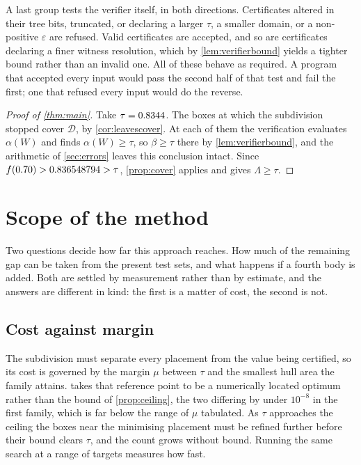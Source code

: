 \documentclass[a4paper,UKenglish,cleveref,autoref,thm-restate,numberwithinsect]{lipics-v2021}
\begin{document}
A last group tests the verifier itself, in both directions. Certificates altered
in their tree bits, truncated, or declaring a larger $\tau$, a smaller domain, or
a non-positive $\varepsilon$ are refused. Valid certificates are accepted, and so
are certificates declaring a finer witness resolution, which by
\cref{lem:verifierbound} yields a tighter bound rather than an invalid one. All
\ControlsPassed{} of these behave as required. A program that accepted every input
would pass the second half of that test and fail the first; one that refused every
input would do the reverse.

\begin{proof}[Proof of \cref{thm:main}]
Take $\tau=0.8344$. The boxes at which the subdivision stopped cover
$\mathcal{D}$, by \cref{cor:leavescover}. At each of them the verification
evaluates $\alpha(W)$ and finds $\alpha(W)\ge\tau$, so $\beta\ge\tau$ there by
\cref{lem:verifierbound}, and the arithmetic of \cref{sec:errors} leaves this
conclusion intact. Since $f(0.70)>0.836548794>\tau$, \cref{prop:cover} applies
and gives $\Lambda\ge\tau$.
\end{proof}

\section{Scope of the method}
\label{sec:scope}

Two questions decide how far this approach reaches. How much of the remaining gap
can be taken from the present test sets, and what happens if a fourth body is
added. Both are settled by measurement rather than by estimate, and the answers
are different in kind: the first is a matter of cost, the second is not.

\subsection{Cost against margin}

The subdivision must separate every placement from the value being certified, so
its cost is governed by the margin $\mu$ between $\tau$ and the smallest hull area
the family attains.  takes that reference point to be a
numerically located optimum rather than the bound of \cref{prop:ceiling}, the two
differing by under $10^{-8}$ in the first family, which is far below the range of
$\mu$ tabulated. As $\tau$ approaches the ceiling the boxes near the
minimising placement must be refined further before their bound clears $\tau$,
and the count grows without bound. Running the same search at a range of targets
measures how fast.
\end{document}
